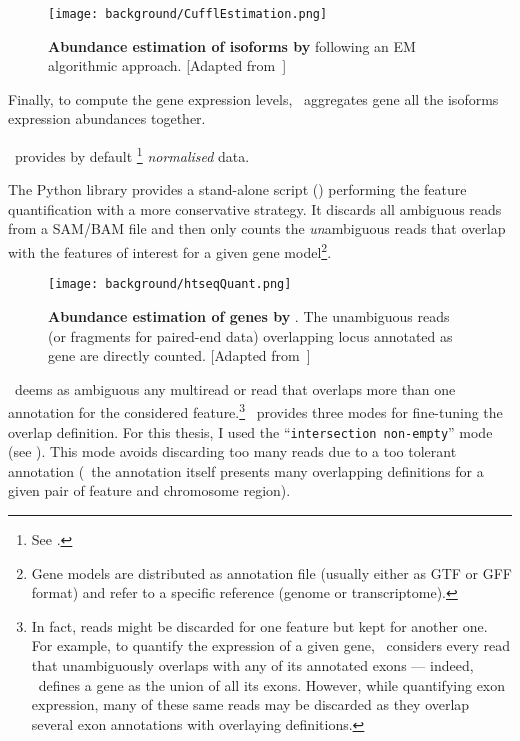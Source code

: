 \begin{figure}
    \texttt{[image: background/CufflEstimation.png]}\centering
    \caption[Abundance estimation of isoforms by
    Cufflinks]{\label{fig:cuffEstimation}\textbf{Abundance estimation of isoforms
    by \cuffl} following an \gls{EM} algorithmic approach. [Adapted
    from~\citet{Turner2015}]}
\end{figure}

Finally, to compute the gene expression levels, \cuffl\ aggregates 
gene all the isoforms expression abundances together.\mybr\

\cuffl\ provides by default \FPKM\footnote{See .}
\emph{normalised} data.\mybr\

The \gls{Python} library  provides a stand-alone script
(\htseq) performing the feature quantification with a more conservative strategy.
It discards all ambiguous reads from a \gls{SAM}/\gls{BAM} file and then
only counts the \emph{un}ambiguous reads that overlap with the features of
interest for a given gene model\footnote{Gene models are distributed as
annotation file (usually either as \gls{GTF} or \gls{GFF} format) and refer
to a specific reference (genome or transcriptome).}.\mybr\

\begin{figure}
    \texttt{[image: background/htseqQuant.png]}\centering
    \caption[Abundance estimation of genes by
    HTSeq-count]{\label{fig:htseqEstimation}\textbf{Abundance estimation of genes
    by \htseq}. The unambiguous reads (or fragments for paired-end data)
    overlapping locus annotated as gene are directly counted. [Adapted
    from~\citet{MarPhD}]}
  \end{figure}

\htseq\ deems as ambiguous any multiread or read that overlaps more than
one annotation for the considered feature.\footnote{In fact, reads might be
discarded for one feature but kept for another one. For example, to quantify the
expression of a given gene, \htseq\ considers every read that unambiguously
overlaps with any of its annotated exons --- indeed, \htseq\ defines a gene
as the union of all its exons. However, while quantifying exon expression, many
of these same reads may be discarded as they overlap several exon annotations
with overlaying definitions.}
\htseq\ provides three modes for fine-tuning the overlap definition.
For this thesis, I used the \enquote{\texttt{intersection non-empty}} mode
(see ).
This mode avoids discarding too many reads due to a too tolerant annotation
(\ie\ the annotation itself presents many overlapping definitions for a given
pair of feature and chromosome region).\mybr\

